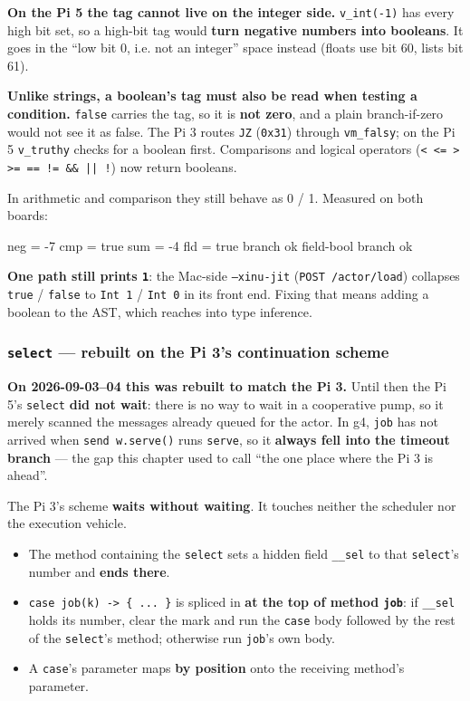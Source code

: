 \documentclass[11pt,a4paper]{article}
\begin{document}
\textbf{On the Pi 5 the tag cannot live on the integer side.} \texttt{v\_int(-1)}
has every high bit set, so a high-bit tag would \textbf{turn negative numbers into
booleans}. It goes in the ``low bit 0, i.e. not an integer'' space instead
(floats use bit 60, lists bit 61).

\textbf{Unlike strings, a boolean's tag must also be read when testing a
condition.} \texttt{false} carries the tag, so it is \textbf{not zero}, and a plain
branch-if-zero would not see it as false. The Pi 3 routes \texttt{JZ}
(\texttt{0x31}) through \texttt{vm\_falsy}; on the Pi 5 \texttt{v\_truthy} checks for
a boolean first. Comparisons and logical operators
(\texttt{< <= > >= == != \&\& || !}) now return booleans.

In arithmetic and comparison they still behave as 0 / 1. Measured on both boards:

\begin{term}
neg = -7        cmp = true      sum = -4      fld = true
branch ok       field-bool branch ok
\end{term}

\textbf{One path still prints \texttt{1}}: the Mac-side \texttt{--xinu-jit}
(\texttt{POST /actor/load}) collapses \texttt{true} / \texttt{false} to
\texttt{Int 1} / \texttt{Int 0} in its front end. Fixing that means adding a boolean
to the AST, which reaches into type inference.

\subsubsection*{\texttt{select} --- rebuilt on the Pi 3's continuation scheme}
\label{sec:pi5-select}

\textbf{On 2026-09-03--04 this was rebuilt to match the Pi 3.}
Until then the Pi 5's \texttt{select} \textbf{did not wait}: there is no way to
wait in a cooperative pump, so it merely scanned the messages already queued for
the actor. In g4, \texttt{job} has not arrived when \texttt{send w.serve()} runs
\texttt{serve}, so it \textbf{always fell into the timeout branch} --- the gap
this chapter used to call ``the one place where the Pi 3 is ahead''.

The Pi 3's scheme \textbf{waits without waiting}. It touches neither the
scheduler nor the execution vehicle.

\begin{itemize}
\item The method containing the \texttt{select} sets a hidden field
  \texttt{\_\_sel} to that \texttt{select}'s number and \textbf{ends there}.
\item \texttt{case job(k) -> \{ ... \}} is spliced in \textbf{at the top of method
  \texttt{job}}: if \texttt{\_\_sel} holds its number, clear the mark and run the
  \texttt{case} body followed by the rest of the \texttt{select}'s method;
  otherwise run \texttt{job}'s own body.
\item A \texttt{case}'s parameter maps \textbf{by position} onto the receiving
  method's parameter.
\end{itemize}
\end{document}
